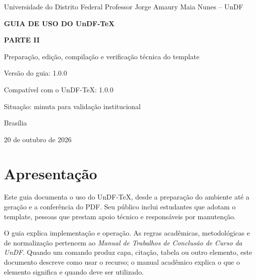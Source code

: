 \documentclass[12pt,a4paper,oneside]{report}
\begin{document}

\begin{titlepage}
  \centering
  \vspace*{1.5cm}
  {\large Universidade do Distrito Federal Professor Jorge Amaury Maia Nunes -- UnDF\par}
  \vspace{3cm}
  {\bfseries\Large GUIA DE USO DO UnDF-TeX\par}
  \vspace{0.45cm}
  {\bfseries\normalsize PARTE II\par}
  \vspace{0.8cm}
  {\normalsize Preparação, edição, compilação e verificação técnica do template\par}
  \vfill
  {\normalsize Versão do guia: 1.0.0\par}
  {\normalsize Compatível com o UnDF-TeX: 1.0.0\par}
  {\normalsize Situação: minuta para validação institucional\par}
  {\normalsize Brasília\par}
  {\normalsize 20 de outubro de 2026\par}
\end{titlepage}

\manualfrontmatter

\chapter*{Apresentação}

Este guia documenta o uso do UnDF-TeX, desde a preparação do ambiente até a geração e a conferência do PDF. Seu público inclui estudantes que adotam o template, pessoas que prestam apoio técnico e responsáveis por manutenção.

O guia explica implementação e operação. As regras acadêmicas, metodológicas e de normalização pertencem ao \emph{Manual de Trabalhos de Conclusão de Curso da UnDF}. Quando um comando produz capa, citação, tabela ou outro elemento, este documento descreve como usar o recurso; o manual acadêmico explica o que o elemento significa e quando deve ser utilizado.


\clearpage
\tableofcontents
\end{document}
